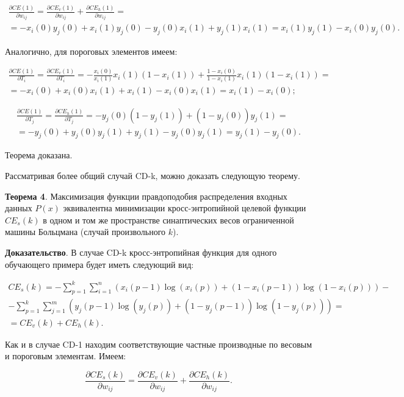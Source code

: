 \begin{multline*}
	\frac{\partial CE(1)}{\partial w_{ij}} = \frac{\partial CE_v(1)}{\partial w_{ij}} + \frac{\partial CE_h(1)}{\partial w_{ij}} = \\ = -x_i(0)y_j(0)+x_i(1)y_j(0) -y_j(0)x_i(1)+y_j(1)x_i(1) = x_i(1)y_j(1) - x_i(0)y_j(0).
\end{multline*}

Аналогично, для пороговых элементов имеем:

\begin{multline*}
	\frac{\partial CE(1)}{\partial T_i} = \frac{\partial CE_v(1)}{\partial T_i} = -\frac{x_i(0)}{x_i(1)}x_i(1)(1-x_i(1))+\frac{1-x_i(0)}{1-x_i(1)}x_i(1)(1-x_i(1)) = \\ = -x_i(0) + x_i(0)x_i(1)+x_i(1)-x_i(0)x_i(1) = x_i(1)-x_i(0);
\end{multline*}

\begin{multline*}
	\frac{\partial CE(1)}{\partial T_j} = \frac{\partial CE_h(1)}{\partial T_j} = -y_j(0)(1-y_j(1)) + (1-y_j(0))y_j(1) = \\ = -y_j(0) + y_j(0)y_j(1) + y_j(1) - y_j(0)y_j(1) = y_j(1) - y_j(0).
\end{multline*}

Теорема доказана. 

Рассматривая более общий случай CD-k, можно доказать следующую теорему.

\textbf{Теорема 4}. Максимизация функции правдоподобия распределения входных данных $P(x)$ эквивалентна минимизации кросс-энтропийной целевой функции $CE_s(k)$ в одном и том же пространстве синаптических весов ограниченной машины Больцмана (случай произвольного $k$).

\textbf{Доказательство}. В случае CD-k кросс-энтропийная функция для одного обучающего примера будет иметь следующий вид:

\begin{multline}
	CE_s(k) = -\sum_{p=1}^k \sum_{i=1}^n (x_i(p-1)\log(x_i(p)) + (1-x_i(p-1))\log(1-x_i(p)))-\\-\sum_{p=1}^k \sum_{j=1}^m (y_j(p-1)\log (y_j(p))+(1-y_j(p-1))\log(1-y_j(p))) = \\ = CE_v(k) + CE_h(k).
\end{multline}

Как и в случае CD-1 находим соответствующие частные производные по весовым и пороговым элементам. Имеем:

\begin{equation*}
	\frac{\partial CE_s(k)}{\partial w_{ij}}= \frac{\partial CE_v(k)}{\partial w_{ij}} + \frac{\partial CE_h(k)}{\partial w_{ij}}.
\end{equation*}


